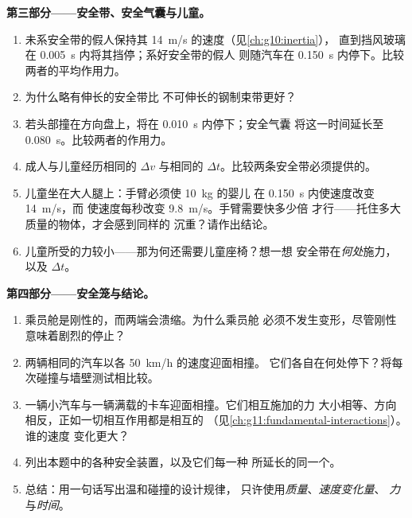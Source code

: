 \begin{problem}
\medskip
\noindent\textbf{第三部分——安全带、安全气囊与儿童。}
\begin{enumerate}[resume]
  \item 未系安全带的假人保持其 \qty{14}{m/s} 的速度（见\cref{ch:g10:inertia}），
        直到挡风玻璃在 \qty{0.005}{s} 内将其挡停；系好安全带的假人
        则随汽车在 \qty{0.150}{s} 内停下。比较两者的平均作用力。
  \item 为什么略有伸长的安全带比
        不可伸长的钢制束带更好？
  \item 若头部撞在方向盘上，将在 \qty{0.010}{s} 内停下；安全气囊
        将这一时间延长至 \qty{0.080}{s}。比较两者的作用力。
  \item 成人与儿童经历相同的 $\Delta v$ 与相同的
        $\Delta t$。比较两条安全带必须提供的。
  \item 儿童坐在大人腿上：手臂必须使 \qty{10}{kg} 的婴儿
        在 \qty{0.150}{s} 内使速度改变 \qty{14}{m/s}，而
        使速度每秒改变 \qty{9.8}{m/s}。手臂需要快多少倍
        才行——托住多大质量的物体，才会感到同样的
        沉重？请作出结论。
  \item 儿童所受的力较小——那为何还需要儿童座椅？想一想
        安全带在\emph{何处}施力，以及 $\Delta t$。
\end{enumerate}

\medskip
\noindent\textbf{第四部分——安全笼与结论。}
\begin{enumerate}[resume]
  \item 乘员舱是刚性的，而两端会溃缩。为什么乘员舱
        必须不发生变形，尽管刚性意味着剧烈的停止？
  \item 两辆相同的汽车以各 \qty{50}{km/h} 的速度迎面相撞。
        它们各自在何处停下？将每次碰撞与墙壁测试相比较。
  \item 一辆小汽车与一辆满载的卡车迎面相撞。它们相互施加的力
        大小相等、方向相反，正如一切相互作用都是相互的
        （见\cref{ch:g11:fundamental-interactions}）。谁的速度
        变化更大？
  \item 列出本题中的各种安全装置，以及它们每一种
        所延长的同一个。
  \item 总结：用一句话写出温和碰撞的设计规律，
        只许使用\emph{质量}、\emph{速度变化量}、
        \emph{力}与\emph{时间}。
\end{enumerate}
\end{problem}
